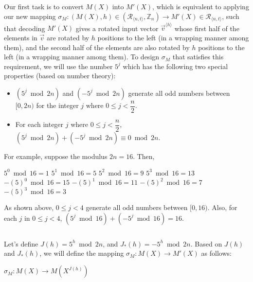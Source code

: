 $ $

 Our first task is to convert $M(X)$ into $M'(X)$, which is equivalent to applying our new mapping $\sigma_M : (M(X), h) \in (\mathcal{R}_{\langle n, t \rangle}, \mathbb{Z}_{n}) \longrightarrow M'(X) \in \mathcal{R}_{\langle n, t \rangle}$, such that decoding $M'(X)$ gives a rotated input vector $\vec{v}^{\langle h \rangle}$ whose first half of the elements in $\vec{v}$ are rotated by $h$ positions to the left (in a wrapping manner among them), and the second half of the elements are also rotated by $h$ positions to the left (in a wrapping manner among them). To design $\sigma_M$ that satisfies this requirement, we will use the number $5^j$ which has the following two special properties (based on number theory):
\begin{itemize}
\item $(5^j \bmod 2n)$ and $(-5^j \bmod 2n)$ generate all odd numbers between $[0, 2n)$ for the integer $j$ where $0 \leq j < \dfrac{n}{2}$. 
\item For each integer $j$ where $0 \leq j < \dfrac{n}{2}$, $(5^j \bmod 2n) + (-5^j \bmod 2n) \equiv 0 \bmod 2n$. 
\end{itemize}
For example, suppose the modulus $2n = 16$. Then, 

\begin{multicols}{2}
\noindent $5^0 \bmod 16 = 1$
\newline $5^1 \bmod 16 = 5$
\newline $5^2 \bmod 16 = 9$
\newline $5^3 \bmod 16 = 13$
\newline $-(5)^0 \bmod 16 = 15$
\newline $-(5)^1 \bmod 16 = 11$
\newline $-(5)^2 \bmod 16 = 7$
\newline $-(5)^3 \bmod 16 = 3$
\end{multicols}


As shown above, $0 \leq j < 4$ generate all odd numbers between $[0, 16)$. Also, for each $j$ in $0 \leq j < 4$, $(5^j \bmod 16) + (-5^j \bmod 16) = 16$. 

$ $

Let's define $J(h) = 5^h \bmod 2n$, \text{ } and \text{ } $J_*(h) = -5^h \bmod 2n$. Based on $J(h)$ and $J_*(h)$, we will define the mapping $\sigma_M : M(X) \rightarrow M'(X)$ as follows:

$\sigma_{M} : M(X) \rightarrow M(X^{J(h)})$

$ $

